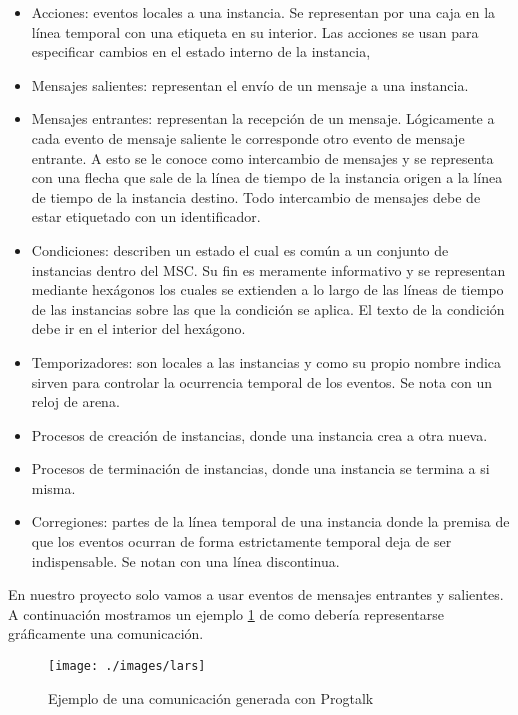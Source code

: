 \begin{itemize}
\item Acciones: eventos locales a una instancia. Se representan por
  una caja en la línea temporal con una etiqueta en su interior. Las
  acciones se usan para especificar cambios en el estado interno de la
  instancia,
\item Mensajes salientes: representan el envío de un mensaje a una
  instancia.
\item Mensajes entrantes: representan la recepción de un
  mensaje. Lógicamente a cada evento de mensaje saliente le
  corresponde otro evento de mensaje entrante. A esto se le conoce
  como intercambio de mensajes y se representa con una flecha que sale
  de la línea de tiempo de la instancia origen a la línea de tiempo de
  la instancia destino. Todo intercambio de mensajes debe de estar
  etiquetado con un identificador.
\item Condiciones: describen un estado el cual es común a un conjunto
  de instancias dentro del MSC. Su fin es meramente informativo y se
  representan mediante hexágonos los cuales se extienden a lo largo de
  las líneas de tiempo de las instancias sobre las que la condición se
  aplica. El texto de la condición debe ir en el interior del
  hexágono.
\item Temporizadores: son locales a las instancias y como su propio
  nombre indica sirven para controlar la ocurrencia temporal de los
  eventos. Se nota con un reloj de arena.
\item Procesos de creación de instancias, donde una instancia crea a
  otra nueva.
\item Procesos de terminación de instancias, donde una instancia se
  termina a si misma.
\item Corregiones: partes de la línea temporal de una instancia donde
  la premisa de que los eventos ocurran de forma estrictamente
  temporal deja de ser indispensable. Se notan con una línea
  discontinua.
\end{itemize}

En nuestro proyecto solo vamos a usar eventos de mensajes entrantes y
salientes. A continuación mostramos un ejemplo \ref{fig:fig1} de como
debería representarse gráficamente una comunicación.

\begin{figure}
  \centering
  \texttt{[image: ./images/lars]}
  \caption{Ejemplo de una comunicación generada con Progtalk}
  \label{fig:fig1}
\end{figure}

